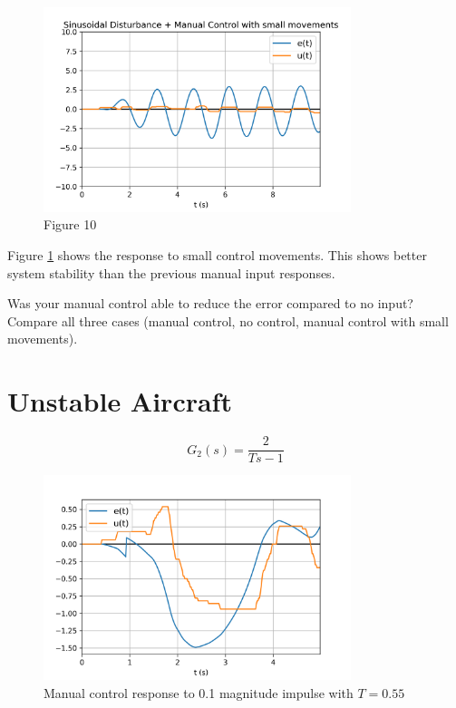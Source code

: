 \documentclass[8pt]{article}
\begin{document}
\begin{figure}[H]
    \centering
    \includegraphics[width=0.8\textwidth]{figures/FIGURE_10.png}
    \caption{Figure 10}
    \label{fig:figure10}
\end{figure}

Figure \ref{fig:figure10} shows the response to small control movements. This shows better system stability than the previous manual input responses.

Was your manual control able to reduce the error compared to no input? Compare all three cases (manual control, no control, manual control with small movements).

\section{Unstable Aircraft}

\begin{equation}
    G_2(s) = \frac{2}{Ts-1}
\end{equation}

\begin{figure}[H]
    \centering
    \includegraphics[width=0.8\textwidth]{figures/FIGURE_11.png}
    \caption{Manual control response to 0.1 magnitude impulse with $T=0.55$}
    \label{fig:figure11}
\end{figure}
\end{document}
